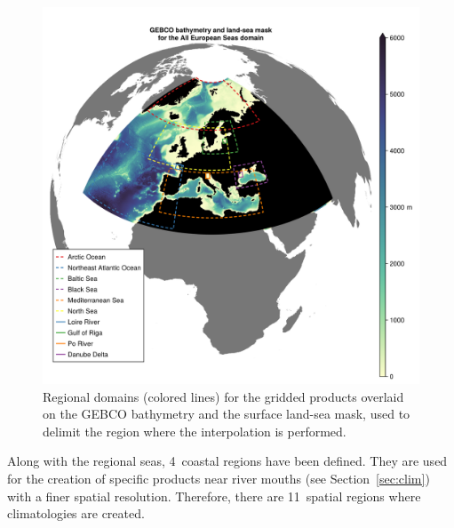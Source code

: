 \documentclass[essd, manuscript]{copernicus}
\begin{document}
\begin{figure}[t]
\includegraphics[width=12cm]{gebco_bathy_mask_domains3}
\caption{Regional domains (colored lines) for the gridded products overlaid on the GEBCO bathymetry and the surface land-sea mask, used to delimit the region where the interpolation is performed.\label{fig:gebco_bathy_mask_domains3}}
\end{figure}

Along with the regional seas, 4~coastal regions have been defined. They are used for the creation of specific products near river mouths (see Section~\ref{sec:clim}) with a finer spatial resolution. Therefore, there are 11~spatial regions where climatologies are created.
\end{document}
